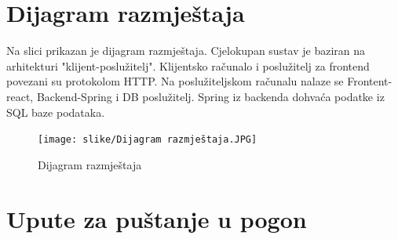 			
			\eject 
		
		
		\section{Dijagram razmještaja}

		{Na slici prikazan je dijagram razmještaja. Cjelokupan sustav je baziran na arhitekturi "klijent-poslužitelj". Klijentsko računalo i poslužitelj za frontend povezani su protokolom HTTP. Na poslužiteljskom računalu nalaze se Frontent-react, Backend-Spring i DB poslužitelj. Spring iz backenda dohvaća podatke iz SQL baze podataka.}
			
		\begin{figure}[H]
			\texttt{[image: slike/Dijagram razmještaja.JPG]}
			\centering
			\caption{Dijagram razmještaja}
			\label{fig:Dijagram razmještaja}
		\end{figure}
		\eject 
		
		\section{Upute za puštanje u pogon}
		
		
